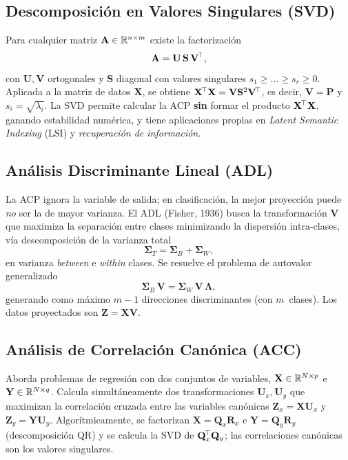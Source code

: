 \subsection{Descomposición en Valores Singulares (SVD)}

Para cualquier matriz $\mathbf{A}\in\mathbb{R}^{n\times m}$ existe la
factorización
\[
\mathbf{A}=\mathbf{U}\,\mathbf{S}\,\mathbf{V}^{\!\top},
\]
con $\mathbf{U},\mathbf{V}$ ortogonales y $\mathbf{S}$ diagonal con
valores singulares $s_1\geq\dots\geq s_r\geq 0$. Aplicada a la matriz
de datos $\mathbf{X}$, se obtiene
$\mathbf{X}^{\!\top}\mathbf{X}=\mathbf{V}\mathbf{S}^2\mathbf{V}^{\!\top}$, es decir,
$\mathbf{V}=\mathbf{P}$ y $s_i=\sqrt{\lambda_i}$. La SVD permite
calcular la ACP \textbf{sin} formar el producto
$\mathbf{X}^{\!\top}\mathbf{X}$, ganando estabilidad numérica, y tiene
aplicaciones propias en \emph{Latent Semantic Indexing} (LSI) y
\emph{recuperación de información}.

\subsection{Análisis Discriminante Lineal (ADL)}

La ACP ignora la variable de salida; en clasificación, la mejor
proyección puede \emph{no} ser la de mayor varianza. El ADL (Fisher,
1936) busca la transformación $\mathbf{V}$ que maximiza la separación
entre clases minimizando la dispersión intra-clases, vía descomposición
de la varianza total
\[
\boldsymbol\Sigma_T = \boldsymbol\Sigma_B + \boldsymbol\Sigma_W,
\]
en varianza \emph{between} e \emph{within} clases. Se resuelve el
problema de autovalor generalizado
\[
\boldsymbol\Sigma_B\,\mathbf{V} = \boldsymbol\Sigma_W\,\mathbf{V}\,
\boldsymbol\Lambda,
\]
generando como máximo $m-1$ direcciones discriminantes (con
$m$~clases). Los datos proyectados son $\mathbf{Z}=\mathbf{X}\mathbf{V}$.

\subsection{Análisis de Correlación Canónica (ACC)}

Aborda problemas de regresión con dos conjuntos de variables,
$\mathbf{X}\in\mathbb{R}^{N\times p}$ e $\mathbf{Y}\in\mathbb{R}^{N\times q}$. Calcula
simultáneamente dos transformaciones $\mathbf{U}_x,\mathbf{U}_y$ que
maximizan la correlación cruzada entre las variables canónicas
$\mathbf{Z}_x=\mathbf{X}\mathbf{U}_x$ y
$\mathbf{Z}_y=\mathbf{Y}\mathbf{U}_y$. Algorítmicamente, se factorizan
$\mathbf{X}=\mathbf{Q}_x\mathbf{R}_x$ e
$\mathbf{Y}=\mathbf{Q}_y\mathbf{R}_y$ (descomposición QR) y se calcula
la SVD de $\mathbf{Q}_x^{\!\top}\mathbf{Q}_y$; las correlaciones canónicas son
los valores singulares.

